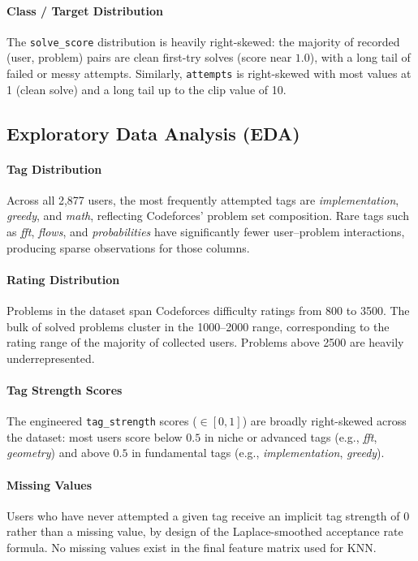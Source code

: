 \documentclass[12pt,a4paper]{article}
\begin{document}
\paragraph{Class / Target Distribution}
The \texttt{solve\_score} distribution is heavily right-skewed: the majority of
recorded (user, problem) pairs are clean first-try solves (score near $1.0$),
with a long tail of failed or messy attempts. Similarly, \texttt{attempts} is
right-skewed with most values at 1 (clean solve) and a long tail up to the clip
value of 10.

\subsection*{Exploratory Data Analysis (EDA)}

\paragraph{Tag Distribution}
Across all 2,877 users, the most frequently attempted tags are
\textit{implementation}, \textit{greedy}, and \textit{math}, reflecting
Codeforces' problem set composition. Rare tags such as \textit{fft},
\textit{flows}, and \textit{probabilities} have significantly fewer user--problem
interactions, producing sparse observations for those columns.

\paragraph{Rating Distribution}
Problems in the dataset span Codeforces difficulty ratings from 800 to 3500.
The bulk of solved problems cluster in the 1000--2000 range, corresponding to
the rating range of the majority of collected users. Problems above 2500 are
heavily underrepresented.

\paragraph{Tag Strength Scores}
The engineered \texttt{tag\_strength} scores ($\in [0,1]$) are broadly
right-skewed across the dataset: most users score below $0.5$ in niche or
advanced tags (e.g., \textit{fft}, \textit{geometry}) and above $0.5$ in
fundamental tags (e.g., \textit{implementation}, \textit{greedy}).

\paragraph{Missing Values}
Users who have never attempted a given tag receive an implicit tag strength of
$0$ rather than a missing value, by design of the Laplace-smoothed acceptance
rate formula. No missing values exist in the final feature matrix used for KNN.
\end{document}
